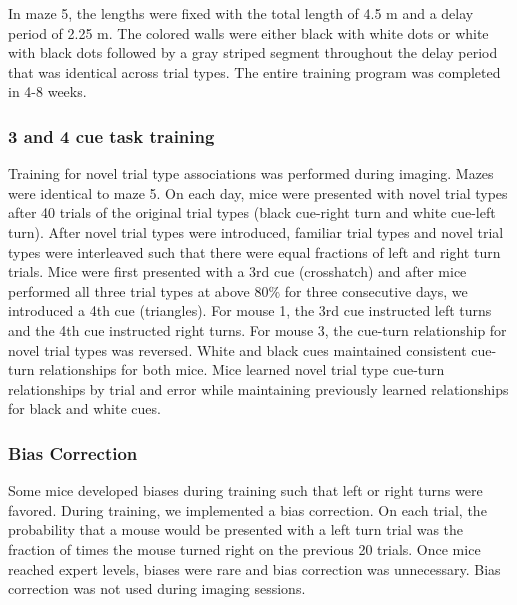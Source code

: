 \bigskip

In maze 5, the lengths were fixed with the total length of 4.5 m and a delay period of 2.25 m. The colored walls were either black with white dots or white with black dots followed by a gray striped segment throughout the delay period that was identical across trial types. The entire training program was completed in 4-8 weeks.

\bigskip

\subsubsection{3 and 4 cue task training}
Training for novel trial type associations was performed during imaging. Mazes were identical to maze 5. On each day, mice were presented with novel trial types after 40 trials of the original trial types (black cue-right turn and white cue-left turn). After novel trial types were introduced, familiar trial types and novel trial types were interleaved such that there were equal fractions of left and right turn trials. Mice were first presented with a 3rd cue (crosshatch) and after mice performed all three trial types at above 80$\%$ for three consecutive days, we introduced a 4th cue (triangles). For mouse 1, the 3rd cue instructed left turns and the 4th cue instructed right turns. For mouse 3, the cue-turn relationship for novel trial types was reversed. White and black cues maintained consistent cue-turn relationships for both mice. Mice learned novel trial type cue-turn relationships by trial and error while maintaining previously learned relationships for black and white cues. 

\bigskip

\subsubsection{Bias Correction}
Some mice developed biases during training such that left or right turns were favored. During training, we implemented a bias correction. On each trial, the probability that a mouse would be presented with a left turn trial was the fraction of times the mouse turned right on the previous 20 trials. Once mice reached expert levels, biases were rare and bias correction was unnecessary. Bias correction was not used during imaging sessions.

